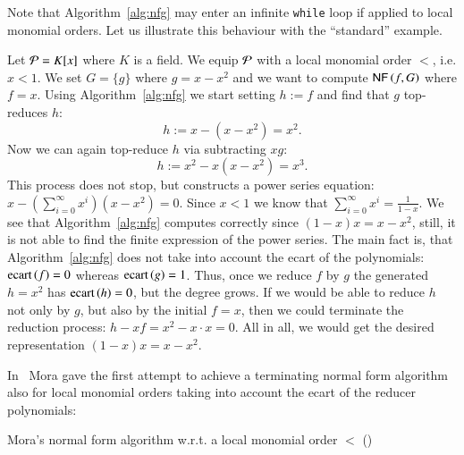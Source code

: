 Note that Algorithm~\ref{alg:nfg} may enter an infinite \texttt{while} loop if applied
to local monomial orders. Let us illustrate this behaviour with the ``standard''
example. 

\begin{example}
\label{ex:local-problems}
Let $\mathcal{P} = K[x]$ where $K$ is a field. We equip $\mathcal{P}$ with a local monomial
order $<$, i.e. $x < 1$. We set $G = \{g\}$ where $g=x-x^2$ and we want to
compute $\text{\sffamily{NF}}\left({f},{G}\right)$ where $f = x$. Using Algorithm~\ref{alg:nfg} we start setting
$h := f$ and find that $g$ top-reduces $h$:
\[h := x - \left(x-x^2\right) = x^2.\]
Now we can again top-reduce $h$ via subtracting $xg$:
\[h := x^2 - x\left(x-x^2\right) = x^3.\]
This process does not stop, but constructs a power series equation:
$x - \left(\sum_{i=0}^\infty x^i\right) \left(x-x^2\right) = 0.$
Since $x<1$ we know that $\sum_{i=0}^\infty x^i = \frac{1}{1-x}$. We see that
Algorithm~\ref{alg:nfg} computes correctly since $(1-x) x = x-x^2$,
still, it is not able to find the finite expression of the power series.
The main fact is, that Algorithm~\ref{alg:nfg} does not take into account the
ecart of the polynomials: $\mathrm{ecart}\left({f}\right) = 0$ whereas $\mathrm{ecart}\left({g}\right) = 1$. Thus, once we
reduce $f$ by $g$ the generated $h = x^2$ has $\mathrm{ecart}\left({h}\right) = 0$, but the degree grows.
If we would be able to reduce $h$ not only by $g$, but also by the
initial $f=x$, then we could terminate the reduction process: $h - xf = x^2 -
x\cdot x = 0$. All in all, we would get the desired representation $(1-x)x = x-x^2$.
\end{example}

In~\cite{mora82} Mora gave the first attempt to achieve a terminating normal
form algorithm also for local monomial orders taking into account the ecart
of the reducer polynomials:

\begin{algorithm}[h]
\caption{Mora's normal form algorithm w.r.t. a local monomial order $<$
  (\nfn)} 
\label{alg:nfl}
\begin{algorithmic}[1]
\EndIf
{}
\EndWhile
{}
\end{algorithmic}
\end{algorithm}

